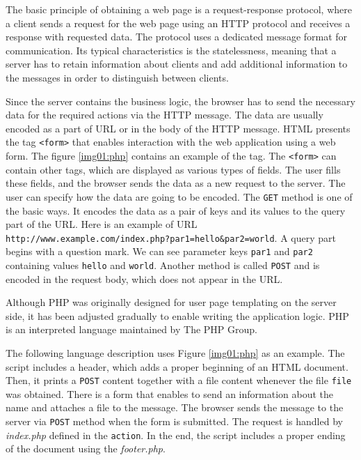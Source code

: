 The basic principle of obtaining a web page is a request-response protocol, where a client sends a request for the web page using an HTTP protocol and receives a response with requested data.
The protocol uses a dedicated message format for communication.
Its typical characteristics is the statelessness, meaning that a server has to retain information about clients and add additional information to the messages in order to distinguish between clients.
\par
Since the server contains the business logic, the browser has to send the necessary data for the required actions via the HTTP message.
The data are usually encoded as a part of \ac{URL} or in the body of the HTTP message.
HTML presents the tag \texttt{<form>} that enables interaction with the web application using a web form.
The figure \ref{img01:php} contains an example of the tag.
The \texttt{<form>} can contain other tags, which are displayed as various types of fields.
The user fills these fields, and the browser sends the data as a new request to the server.
The user can specify how the data are going to be encoded.
The \texttt{GET} method is one of the basic ways.
It encodes the data as a pair of keys and its values to the query part of the URL.
Here is an example of URL
\texttt{http://www.example.com/index.php?par1=hello\&par2=world}.
A query part begins with a question mark.
We can see parameter keys \texttt{par1} and \texttt{par2} containing values \texttt{hello} and \texttt{world}.
Another method is called \texttt{POST} and is encoded in the request body, which does not appear in the URL.
\par
Although PHP \cite{online:phpWiki} was originally designed for user page templating on the server side, it has been adjusted gradually to enable writing the application logic.
PHP is an interpreted language maintained by The PHP Group.
\par
The following language description uses Figure \ref{img01:php} as an example.
The script includes a header, which adds a proper beginning of an HTML document.
Then, it prints a \texttt{POST} content together with a file content whenever the file \texttt{file} was obtained.
There is a form that enables to send an information about the name and attaches a file to the message.
The browser sends the message to the server via \texttt{POST} method when the form is submitted.
The request is handled by \textit{index.php} defined in the \texttt{action}.
In the end, the script includes a proper ending of the document using the \textit{footer.php}.
\par
